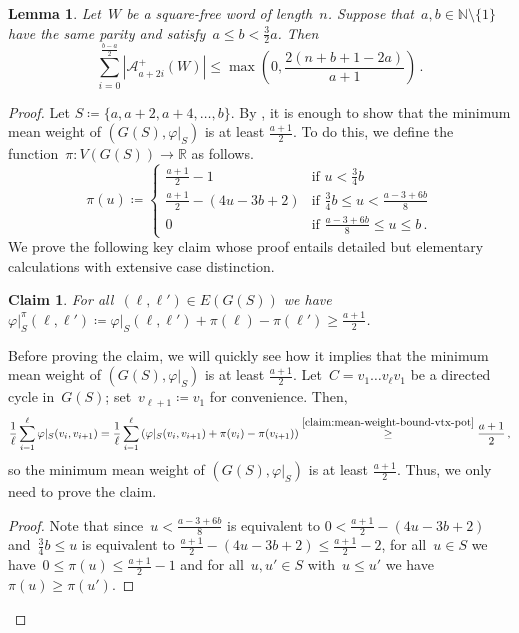 \documentclass[12pt]{article}
\theoremstyle{plain}
\newtheorem{lemma}[theorem]{Lemma}
\newtheorem{claim}[theorem]{Claim}
\theoremstyle{definition}
\newcommand{\oldqed}{}
\def\endofClaim{\hfill\scalebox{.6}{$\Box$}}
\newenvironment{claimproof}[1][Proof]{
	\renewcommand{\oldqed}{\qedsymbol}
	\renewcommand{\qedsymbol}{\endofClaim}
	\begin{proof}[#1]
	}{
	\end{proof}
	\renewcommand{\qedsymbol}{\oldqed}
}
\newcommand\N{\mathbb{N}}
\newcommand\R{\mathbb{R}}
\newcommand{\coleq}{\coloneq}
\newcommand{\cA}{\mathcal A}
\newcommand{\f}{\varphi}
\newcommand{\w}{\f\vert_S}
\newcommand{\abs}[1]{\mathopen{}\left\lvert#1\right\rvert\mathclose{}}
\begin{document}
	\begin{lemma}\label{lem:bound-same-parity-twothirds}
		Let~$W$ be a square-free word of length~$n$. Suppose that~$a,b\in\N\setminus\{1\}$ have the same parity and satisfy~$a\le b<\frac{3}{2}a$. Then
		\[\sum_{i=0}^{\frac{b-a}{2}}\abs{\cA^{+}_{a+2i}(W)}\le \max\!\left(0,\frac{2(n+b+1-2a)}{a+1}\right)\,.\]
	\end{lemma}
	
	\begin{proof}
		Let $S\coleq\{a,a+2,a+4,\dots,b\}$. By , it is enough to show that the minimum mean weight of $(G(S),\w)$ is at least $\frac{a+1}{2}$. To do this, we define the function~$\pi\colon V(G(S))\to\R$ as follows.
		\begin{equation*}
			\pi(u)\coleq
			\begin{cases}
				\frac{a+1}{2}-1 &\textrm{if }u<\frac{3}{4}b \\
				\frac{a+1}{2}-(4u-3b+2) &\textrm{if }\frac{3}{4}b\le u< \frac{a-3+6b}{8} \\
				0 &\textrm{if }\frac{a-3+6b}{8}\le u\le b\,.
			\end{cases}
		\end{equation*}
		We prove the following key claim whose proof entails detailed but elementary calculations with extensive case distinction.
		
		\begin{claim} \label{claim:mean-weight-bound-vtx-pot}
			For all~$(\ell,\ell')\in E(G(S))$ we have~$\w^{\pi}(\ell,\ell')\coleq\w(\ell,\ell')+\pi(\ell)-\pi(\ell')\ge\frac{a+1}{2}$.
		\end{claim}
		Before proving the claim, we will quickly see how it implies that the minimum mean weight of $(G(S),\w)$ is at least $\frac{a+1}{2}$. Let~$C=v_1\dots v_{\ell}v_1$ be a directed cycle in~$G(S)$; set~$v_{\ell+1}\coleq v_1$ for convenience. Then, 
		\[ \frac{1}{\ell}\sum_{i=1}^{\ell}\w(v_i,v_{i+1}) = \frac{1}{\ell}\sum_{i=1}^{\ell}\left(\w(v_i,v_{i+1})+\pi(v_i)-\pi(v_{i+1})\right) \overset{\ref{claim:mean-weight-bound-vtx-pot}}\ge \frac{a+1}{2}\,, \]
		so the minimum mean weight of $(G(S),\w)$ is at least $\frac{a+1}{2}$. Thus, we only need to prove the claim.
		\begin{claimproof}
			Note that since~$u<\frac{a-3+6b}{8}$ is equivalent to $0<\frac{a+1}{2}-(4u-3b+2)$ and~$\frac{3}{4}b\le u$ is equivalent to $\frac{a+1}{2}-(4u-3b+2)\le \frac{a+1}{2}-2$, for all~$u\in S$ we have~$0\le\pi(u)\le \frac{a+1}{2}-1$ and for all~$u,u'\in S$ with~$u\le u'$ we have~$\pi(u)\ge \pi(u')$.
			

\end{claimproof}
\end{proof}
\end{document}
